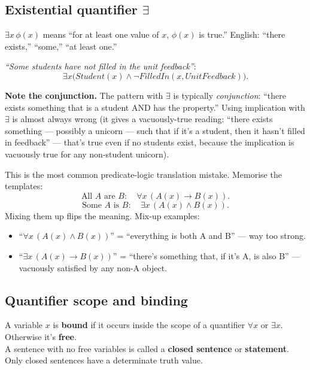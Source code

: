\documentclass[11pt, a4paper]{article}
\begin{document}
\subsection{\texorpdfstring{Existential quantifier $\exists$}{Existential quantifier (exists)}}

\begin{defbox}
$\exists x \, \phi(x)$ means ``for at least one value of $x$, $\phi(x)$ is true.'' English: ``there exists,'' ``some,'' ``at least one.''
\end{defbox}

\textit{``Some students have not filled in the unit feedback''}:
\[
\exists x \bigl(Student(x) \land \neg FilledIn(x, UnitFeedback)\bigr).
\]

\textbf{Note the conjunction.} The pattern with $\exists$ is typically \emph{conjunction}: ``there exists something that is a student AND has the property.'' Using implication with $\exists$ is almost always wrong (it gives a vacuously-true reading: ``there exists something — possibly a unicorn — such that if it's a student, then it hasn't filled in feedback'' — that's true even if no students exist, because the implication is vacuously true for any non-student unicorn).

\begin{trapbox}
This is the most common predicate-logic translation mistake. Memorise the templates:
\[
\text{All } A \text{ are } B: \quad \forall x \, (A(x) \rightarrow B(x)).
\]
\[
\text{Some } A \text{ is } B: \quad \exists x \, (A(x) \land B(x)).
\]
Mixing them up flips the meaning. Mix-up examples:
\begin{itemize}[leftmargin=*, itemsep=0pt, topsep=0pt]
  \item ``$\forall x \, (A(x) \land B(x))$'' = ``everything is both A and B'' — way too strong.
  \item ``$\exists x \, (A(x) \rightarrow B(x))$'' = ``there's something that, if it's A, is also B'' — vacuously satisfied by any non-A object.
\end{itemize}
\end{trapbox}

\subsection{Quantifier scope and binding}

\begin{defbox}
A variable $x$ is \textbf{bound} if it occurs inside the scope of a quantifier $\forall x$ or $\exists x$. Otherwise it's \textbf{free}.\\[0.3em]
A sentence with no free variables is called a \textbf{closed sentence} or \textbf{statement}. Only closed sentences have a determinate truth value.
\end{defbox}
\end{document}
